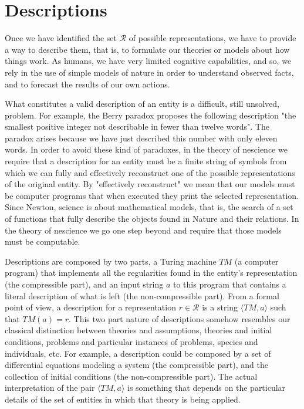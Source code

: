 %
%

\section{Descriptions}

Once we have identified the set $\mathcal{R}$ of possible representations, we have to provide a way to describe them, that is, to formulate our theories or models about how things work. As humans, we have very limited cognitive capabilities, and so, we rely in the use of simple models of nature in order to understand observed facts, and to forecast the results of our own actions. 

What constitutes a valid description of an entity is a difficult, still unsolved, problem. For example, the Berry paradox proposes the following description "the smallest positive integer not describable in fewer than twelve words". The paradox arises because we have just described this number with only eleven words. In order to avoid these kind of paradoxes, in the theory of nescience we require that a description for an entity must be a finite string of symbols from which we can fully and effectively reconstruct one of the possible representations of the original entity. By "effectively reconstruct" we mean that our models must be computer programs that when executed they print the selected representation. Since Newton, science is about mathematical models, that is, the search of a set of functions that fully describe the objects found in Nature and their relations. In the theory of nescience we go one step beyond and require that those models must be computable.

Descriptions are composed by two parts, a Turing machine $TM$ (a computer program) that implements all the regularities found in the entity's representation (the compressible part), and an input string $a$ to this program that contains a literal description of what is left (the non-compressible part). From a formal point of view, a description for a representation $r \in \mathcal{R}$ is a string $\langle TM, a \rangle$ such that $TM(a) = r$. This two part nature of descriptions somehow resembles our classical distinction between theories and assumptions, theories and initial conditions, problems and particular instances of problems, species and individuals, etc. For example, a description could be composed by a set of differential equations modeling a system (the compressible part), and the collection of initial conditions (the non-compressible part). The actual interpretation of the pair $\langle TM, a \rangle$ is something that depends on the particular details of the set of entities in which that theory is being applied.


